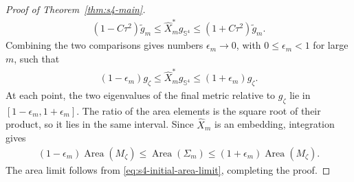 \documentclass[a4paper,11pt,oneside,reqno]{amsart}
\numberwithin{equation}{section}
\theoremstyle{definition}
\let\textcedilla\c
\renewcommand{\c}{\mathbb{C}}
\begin{document}
\begin{proof}[Proof of Theorem~\ref{thm:s4-main}]
\begin{align*}
        (1-C\tau^2)\widetilde g_m
        \leq\widehat X_m^*g_{\mathbb S^4}
        \leq(1+C\tau^2)\widetilde g_m.
    \end{align*}
    Combining the two comparisons gives numbers
    $\epsilon_m\to0$, with $0\leq\epsilon_m<1$ for
    large $m$, such that
    \begin{align*}
        (1-\epsilon_m)g_\zeta
        \leq\widehat X_m^*g_{\mathbb S^4}
        \leq(1+\epsilon_m)g_\zeta.
    \end{align*}
    At each point, the two eigenvalues of the final metric
    relative to $g_\zeta$ lie in
    $[1-\epsilon_m,1+\epsilon_m]$. The ratio of the area
    elements is the square root of their product, so it
    lies in the same interval. Since $\widehat X_m$ is an
    embedding, integration gives
    \begin{align*}
        (1-\epsilon_m)\operatorname{Area}(M_\zeta)
        \leq\operatorname{Area}(\Sigma_m)
        \leq(1+\epsilon_m)\operatorname{Area}(M_\zeta).
    \end{align*}
    The area limit follows from
    \eqref{eq:s4-initial-area-limit}, completing the proof.
\end{proof}


\let\c\textcedilla
\end{document}
